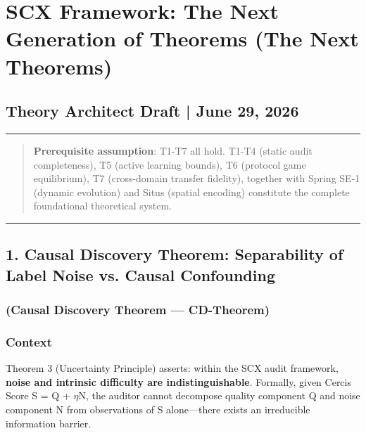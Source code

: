 \documentclass[
  12pt,
]{article}
\author{SCX}
\date{2026}
\begin{document}
\section{SCX Framework: The Next Generation of Theorems (The Next Theorems)}\label{scx-framework-next-theorems}

\subsection{Theory Architect Draft | June 29, 2026}\label{theory-architect-draft}

\begin{center}\rule{0.5\linewidth}{0.5pt}\end{center}

\begin{quote}
\textbf{Prerequisite assumption}: T1-T7 all hold. T1-T4 (static audit completeness), T5 (active learning bounds), T6 (protocol game equilibrium), T7 (cross-domain transfer fidelity), together with Spring SE-1 (dynamic evolution) and Situs (spatial encoding) constitute the complete foundational theoretical system.
\end{quote}

\begin{center}\rule{0.5\linewidth}{0.5pt}\end{center}

\subsection{1. Causal Discovery Theorem: Separability of Label Noise vs. Causal Confounding}\label{causal-discovery-theorem}

\subsubsection{(Causal Discovery Theorem --- CD-Theorem)}\label{cd-theorem-next}

\subsubsection{Context}\label{context-cd}

Theorem 3 (Uncertainty Principle) asserts: within the SCX audit framework, \textbf{noise and intrinsic difficulty are indistinguishable}. Formally, given Cercis Score S = Q + $\eta$N, the auditor cannot decompose quality component Q and noise component N from observations of S alone---there exists an irreducible information barrier.
\end{document}
